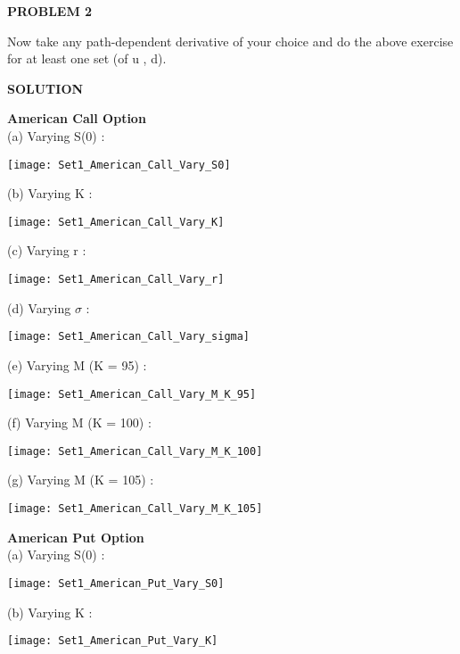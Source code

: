 \documentclass{article}
\begin{document}
\begin{center}
\textbf{PROBLEM 2}
\end{center}

Now take any path-dependent derivative of your choice and do the above exercise for at least one set (of u , d).

\begin{center}
\textbf{SOLUTION}
\end{center}

\textbf{American Call Option}\\
(a) Varying S(0) :
\begin{center}
\texttt{[image: Set1\_American\_Call\_Vary\_S0]}
\end{center}

(b) Varying K :
\begin{center}
\texttt{[image: Set1\_American\_Call\_Vary\_K]}\\
\end{center}

(c) Varying r :
\begin{center}
\texttt{[image: Set1\_American\_Call\_Vary\_r]}
\end{center}

(d) Varying $\sigma$ :
\begin{center}
\texttt{[image: Set1\_American\_Call\_Vary\_sigma]}\\
\end{center}

(e) Varying M (K = 95) :
\begin{center}
\texttt{[image: Set1\_American\_Call\_Vary\_M\_K\_95]}
\end{center}
\newpage
(f) Varying M (K = 100) :
\begin{center}
\texttt{[image: Set1\_American\_Call\_Vary\_M\_K\_100]}\\
\end{center}

(g) Varying M (K = 105) :
\begin{center}
\texttt{[image: Set1\_American\_Call\_Vary\_M\_K\_105]}\\
\end{center}

\textbf{American Put Option}\\
(a) Varying S(0) :
\begin{center}
\texttt{[image: Set1\_American\_Put\_Vary\_S0]}
\end{center}
\newpage
(b) Varying K :
\begin{center}
\texttt{[image: Set1\_American\_Put\_Vary\_K]}\\
\end{center}
\end{document}
